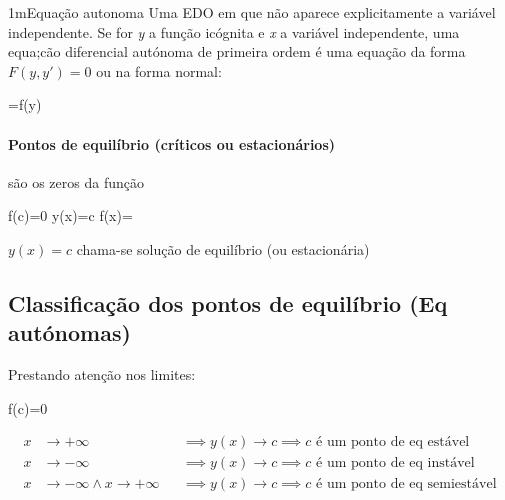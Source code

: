 \documentclass["AM3C-Slides_annotations.tex"]{subfiles}
\begin{document}
\begin{sectionBox}1m{Equação autonoma} %
  Uma EDO em que não aparece explicitamente a variável independente.
  Se for \textit{y} a função icógnita e \textit{x} a variável independente, uma equa;cão diferencial autónoma de primeira ordem é uma equação da forma \(F(y,y')=0\) ou na forma normal:
  \begin{BM}
    =f(y)
  \end{BM}
  \paragraph*{Pontos de equilíbrio (críticos ou estacionários)} são os zeros da função 
  \begin{BM}
    f(c)=0 \implies y(x)=c  f(x)=
  \end{BM}
  \(y(x)=c\) chama-se solução de equilíbrio (ou estacionária)


  \subsection*{Classificação dos pontos de equilíbrio (Eq autónomas)}
  Prestando atenção nos limites:
  \begin{BM}
    f(c)=0
  \end{BM}
  \begin{align*}
       x &\to +\infty          && \implies y(x) \to c \implies c \text{ é um ponto de eq estável}
    \\ x &\to -\infty          && \implies y(x) \to c \implies c \text{ é um ponto de eq instável}
    \\ x &\to -\infty \land x \to +\infty && \implies y(x) \to c \implies c \text{ é um ponto de eq semiestável}
  \end{align*}
\end{sectionBox}
\end{document}

